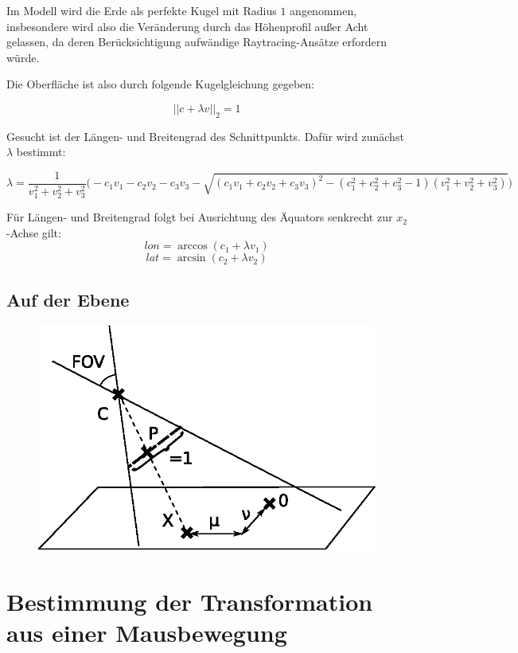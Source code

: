 \documentclass[10pt]{scrreprt}
\begin{document}
Im Modell wird die Erde als perfekte Kugel mit Radius $1$ angenommen, insbesondere wird also die Veränderung durch das Höhenprofil außer Acht gelassen, da deren Berücksichtigung aufwändige Raytracing-Ansätze erfordern würde.

Die Oberfläche ist also durch folgende Kugelgleichung gegeben:

\[||c+\lambda v||_2 = 1\]

Gesucht ist der Längen- und Breitengrad des Schnittpunkts. Dafür wird zunächst $\lambda$ bestimmt:

\vspace{7mm}
\begin{equation*}
\lambda = \frac{1}{v_1^2+v_2^2+v_3^2}\Big(-c_1v_1-c_2v_2-c_3v_3
-\sqrt{\left(c_1v_1+c_2v_2+c_3v_3\right)^2-(c_1^2+c_2^2+c_3^2-1)(v_1^2+v_2^2+v_3^2)}\Big)
\end{equation*}

Für Längen- und Breitengrad folgt bei Ausrichtung des Äquators senkrecht zur $x_2$-Achse gilt:
\[lon = \arccos(c_1+\lambda v_1)\]
\[lat = \arcsin(c_2+\lambda v_2)\]

\newpage

\subsection{Auf der Ebene}
\begin{figure}[!htb]
\includegraphics[scale=0.75]{algo/SchnittEbene.eps}
\end{figure}

\newpage
\section{Bestimmung der Transformation aus einer Mausbewegung}
\end{document}
